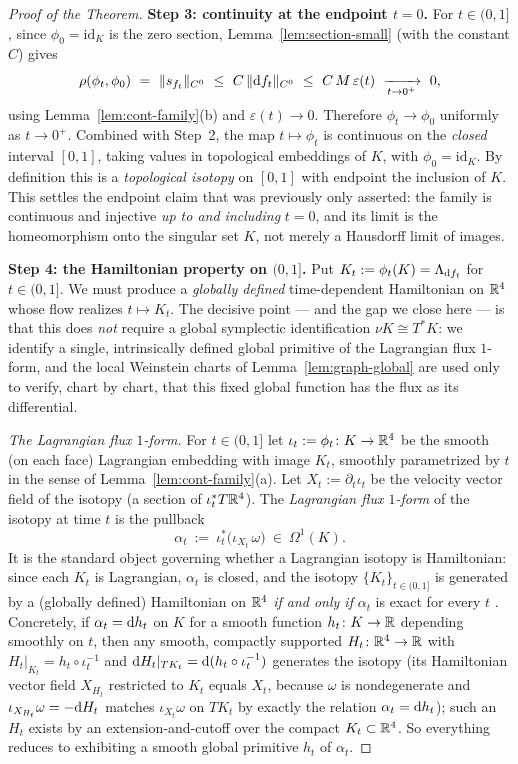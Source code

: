 \begin{proof}[Proof of the Theorem]
\medskip
\noindent\textbf{Step 3: continuity at the endpoint $t=0$.}
For $t\in(0,1]$, since $\phi_0=\mathrm{id}_K$ is the zero section,
Lemma~\ref{lem:section-small} (with the constant $C$) gives
\[
\rho(\phi_t,\phi_0)\ =\ \|s_{f_t}\|_{C^0}\ \le\ C\,\|\qeightdd f_t\|_{C^0}
\ \le\ C\,M\,\varepsilon(t)\ \xrightarrow[t\to0^+]{}\ 0 ,
\]
using Lemma~\ref{lem:cont-family}(b) and $\varepsilon(t)\to0$. Therefore
$\phi_t\to\phi_0$ uniformly as $t\to0^+$. Combined with Step~2, the map
$t\mapsto\phi_t$ is continuous on the \emph{closed} interval $[0,1]$, taking
values in topological embeddings of $K$, with $\phi_0=\mathrm{id}_K$. By
definition this is a \emph{topological isotopy} on $[0,1]$ with endpoint the
inclusion of $K$. This settles the endpoint claim that was previously only
asserted: the family is continuous and injective \emph{up to and including}
$t=0$, and its limit is the homeomorphism onto the singular set $K$, not merely a
Hausdorff limit of images.

\medskip
\noindent\textbf{Step 4: the Hamiltonian property on $(0,1]$.}
Put $K_t:=\phi_t(K)=\Lambda_{\mathrm d f_t}$ for $t\in(0,1]$. We must produce a
\emph{globally defined} time-dependent Hamiltonian on $\mathbb{R}^4$ whose flow realizes
$t\mapsto K_t$. The decisive point — and the gap we close here — is that this does
\emph{not} require a global symplectic identification $\nu K\cong T^*K$: we
identify a single, intrinsically defined global primitive of the Lagrangian flux
$1$-form, and the local Weinstein charts of Lemma~\ref{lem:graph-global} are used
only to verify, chart by chart, that this fixed global function has the flux as its
differential.

\medskip
\noindent\emph{The Lagrangian flux $1$-form.}
For $t\in(0,1]$ let $\iota_t:=\phi_t\colon K\to\mathbb{R}^4$ be the smooth (on each face)
Lagrangian embedding with image $K_t$, smoothly parametrized by $t$ in the sense of
Lemma~\ref{lem:cont-family}(a). Let $X_t:=\partial_t\iota_t$ be the velocity vector
field of the isotopy (a section of $\iota_t^*T\mathbb{R}^4$). The \emph{Lagrangian flux
$1$-form} of the isotopy at time $t$ is the pullback
\[
\alpha_t\ :=\ \iota_t^{*}\bigl(\iota_{X_t}\,\omega\bigr)\ \in\ \Omega^1(K).
\]
It is the standard object governing whether a Lagrangian isotopy is Hamiltonian:
since each $K_t$ is Lagrangian, $\alpha_t$ is closed, and the isotopy
$\{K_t\}_{t\in(0,1]}$ is generated by a (globally defined) Hamiltonian on $\mathbb{R}^4$
\emph{if and only if} $\alpha_t$ is exact for every $t$ \cite[\S9.1]{McDuffSalamon}.
Concretely, if $\alpha_t=\mathrm d h_t$ on $K$ for a smooth function
$h_t\colon K\to\mathbb{R}$ depending smoothly on $t$, then any smooth, compactly supported
$H_t\colon\mathbb{R}^4\to\mathbb{R}$ with $H_t|_{K_t}=h_t\circ\iota_t^{-1}$ and
$\mathrm d H_t|_{TK_t}=\mathrm d(h_t\circ\iota_t^{-1})$ generates the isotopy (its Hamiltonian
vector field $X_{H_t}$ restricted to $K_t$ equals $X_t$, because $\omega$ is
nondegenerate and $\iota_{X_{H_t}}\omega=-\mathrm d H_t$ matches $\iota_{X_t}\omega$ on
$TK_t$ by exactly the relation $\alpha_t=\mathrm d h_t$); such an $H_t$ exists by an
extension-and-cutoff over the compact $K_t\subset\mathbb{R}^4$. So everything reduces to
exhibiting a smooth global primitive $h_t$ of $\alpha_t$.


\end{proof}
